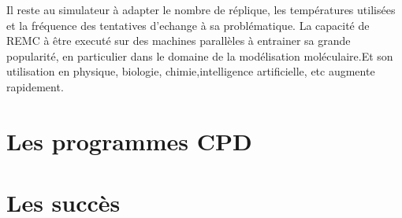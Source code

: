 Il reste au simulateur à adapter le nombre de réplique, les températures utilisées et la fréquence des tentatives d'echange à sa problématique. La capacité de REMC à être executé sur des machines parallèles à entrainer sa grande popularité, en particulier dans le domaine de la modélisation moléculaire.Et son utilisation en physique, biologie, chimie,intelligence artificielle, etc augmente rapidement.


\section{Les programmes CPD}
\section{Les succès}

